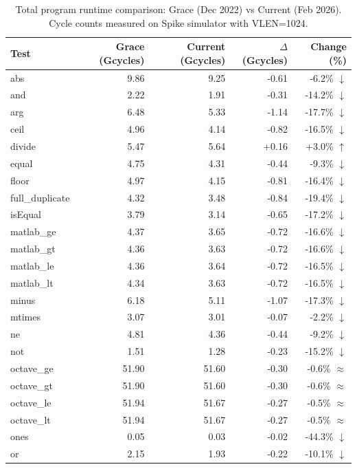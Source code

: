 \begin{table}[H]
\centering
\caption{Total program runtime comparison: Grace (Dec 2022) vs Current (Feb 2026). Cycle counts measured on Spike simulator with VLEN=1024.}
\label{tab:total-runtime}
\small
\begin{tabular}{l r r r r}
\toprule
Test & Grace (Gcycles) & Current (Gcycles) & $\Delta$ (Gcycles) & Change (\%) \\
\midrule
  abs & 9.86 & 9.25 & -0.61 & -6.2\% $\downarrow$ \\
  and & 2.22 & 1.91 & -0.31 & -14.2\% $\downarrow$ \\
  arg & 6.48 & 5.33 & -1.14 & -17.7\% $\downarrow$ \\
  ceil & 4.96 & 4.14 & -0.82 & -16.5\% $\downarrow$ \\
  divide & 5.47 & 5.64 & +0.16 & +3.0\% $\uparrow$ \\
  equal & 4.75 & 4.31 & -0.44 & -9.3\% $\downarrow$ \\
  floor & 4.97 & 4.15 & -0.81 & -16.4\% $\downarrow$ \\
  full\_duplicate & 4.32 & 3.48 & -0.84 & -19.4\% $\downarrow$ \\
  isEqual & 3.79 & 3.14 & -0.65 & -17.2\% $\downarrow$ \\
  matlab\_ge & 4.37 & 3.65 & -0.72 & -16.6\% $\downarrow$ \\
  matlab\_gt & 4.36 & 3.63 & -0.72 & -16.6\% $\downarrow$ \\
  matlab\_le & 4.36 & 3.64 & -0.72 & -16.5\% $\downarrow$ \\
  matlab\_lt & 4.34 & 3.63 & -0.72 & -16.5\% $\downarrow$ \\
  minus & 6.18 & 5.11 & -1.07 & -17.3\% $\downarrow$ \\
  mtimes & 3.07 & 3.01 & -0.07 & -2.2\% $\downarrow$ \\
  ne & 4.81 & 4.36 & -0.44 & -9.2\% $\downarrow$ \\
  not & 1.51 & 1.28 & -0.23 & -15.2\% $\downarrow$ \\
  octave\_ge & 51.90 & 51.60 & -0.30 & -0.6\% $\approx$ \\
  octave\_gt & 51.90 & 51.60 & -0.30 & -0.6\% $\approx$ \\
  octave\_le & 51.94 & 51.67 & -0.27 & -0.5\% $\approx$ \\
  octave\_lt & 51.94 & 51.67 & -0.27 & -0.5\% $\approx$ \\
  ones & 0.05 & 0.03 & -0.02 & -44.3\% $\downarrow$ \\
  or & 2.15 & 1.93 & -0.22 & -10.1\% $\downarrow$ \\

\end{tabular}
\end{table}
